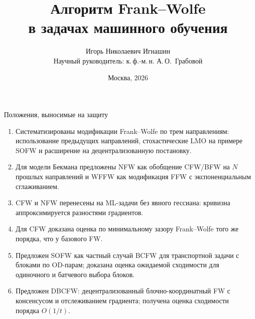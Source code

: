 \documentclass{beamer}
\title[\hbox to 56mm{Алгоритм Frank--Wolfe в машинном обучении}]{Алгоритм Frank--Wolfe\\ в задачах машинного обучения}
\author[И.\,Н.~Игнашин]{Игорь Николаевич Игнашин\\
\small Научный руководитель: к.\,ф.-м.\,н. А.\,О.~Грабовой}
\institute{Кафедра интеллектуальных систем ФПМИ МФТИ\\
Специализация: Интеллектуальный анализ данных}
\date{Москва, 2026}
\begin{document}
\begin{frame}
\thispagestyle{empty}
\maketitle
\end{frame}

\begin{frame}{Положения, выносимые на защиту}
    \footnotesize
    \begin{enumerate}
        \item Систематизированы модификации Frank--Wolfe по трем направлениям: использование предыдущих направлений, стохастические LMO на примере SOFW и расширение на децентрализованную постановку.
        \item Для модели Бекмана предложены NFW как обобщение CFW/BFW на $N$ прошлых направлений и WFFW как модификация FFW с экспоненциальным сглаживанием.
        \item CFW и NFW перенесены на ML-задачи без явного гессиана: кривизна аппроксимируется разностями градиентов.
        \item Для CFW доказана оценка по минимальному зазору Frank--Wolfe того же порядка, что у базового FW.
        \item Предложен SOFW как частный случай BCFW для транспортной задачи с блоками по OD-парам; доказана оценка ожидаемой сходимости для одиночного и батчевого выбора блоков.
        \item Предложен DBCFW: децентрализованный блочно-координатный FW с консенсусом и отслеживанием градиента; получена оценка сходимости порядка $O(1/t)$.
    \end{enumerate}
\end{frame}
\end{document}
